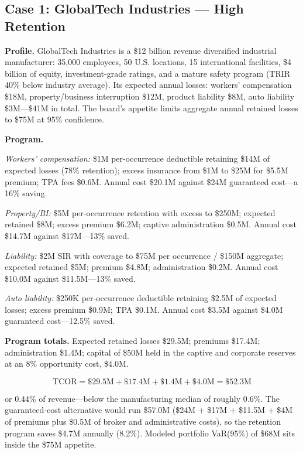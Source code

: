 \documentclass[11pt,openany]{book}
\begin{document}
\subsection{Case 1: GlobalTech Industries --- High Retention}
\label{subsec:globaltech-case}

\textbf{Profile.} GlobalTech Industries is a \$12 billion revenue diversified
industrial manufacturer: 35,000 employees, 50 U.S. locations, 15
international facilities, \$4 billion of equity, investment-grade ratings,
and a mature safety program (TRIR 40\% below industry average). Its expected
annual losses: workers' compensation \$18M, property/business interruption
\$12M, product liability \$8M, auto liability \$3M---\$41M in total. The
board's appetite limits aggregate annual retained losses to \$75M at 95\%
confidence.

\textbf{Program.}

\emph{Workers' compensation:} \$1M per-occurrence deductible retaining \$14M
of expected losses (78\% retention); excess insurance from \$1M to \$25M for
\$5.5M premium; TPA fees \$0.6M. Annual cost \$20.1M against \$24M guaranteed
cost---a 16\% saving.

\emph{Property/BI:} \$5M per-occurrence retention with excess to \$250M;
expected retained \$8M; excess premium \$6.2M; captive administration \$0.5M.
Annual cost \$14.7M against \$17M---13\% saved.

\emph{Liability:} \$2M SIR with coverage to \$75M per occurrence / \$150M
aggregate; expected retained \$5M; premium \$4.8M; administration \$0.2M.
Annual cost \$10.0M against \$11.5M---13\% saved.

\emph{Auto liability:} \$250K per-occurrence deductible retaining \$2.5M of
expected losses; excess premium \$0.9M; TPA \$0.1M. Annual cost \$3.5M
against \$4.0M guaranteed cost---12.5\% saved.

\textbf{Program totals.} Expected retained losses \$29.5M; premiums \$17.4M;
administration \$1.4M; capital of \$50M held in the captive and corporate
reserves at an 8\% opportunity cost, \$4.0M.

\[
\text{TCOR} = \$29.5\text{M} + \$17.4\text{M} + \$1.4\text{M} + \$4.0\text{M}
= \$52.3\text{M}
\]

or 0.44\% of revenue---below the manufacturing median of roughly 0.6\%. The
guaranteed-cost alternative would run \$57.0M (\$24M + \$17M + \$11.5M +
\$4M of premiums plus \$0.5M of broker and administrative costs), so the
retention program saves \$4.7M annually (8.2\%). Modeled portfolio VaR(95\%)
of \$68M sits inside the \$75M appetite.
\end{document}
